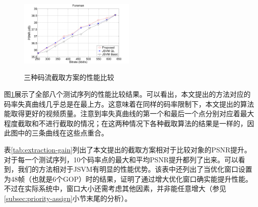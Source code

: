 \begin{figure}[!ht]
{		\includegraphics[width=0.5\textwidth]{figures/Foreman.jpg}
		\label{fig:Foreman}}
	\qquad
	\caption{三种码流截取方案的性能比较}
	\label{fig:extraction-performance}
\end{figure}

图\ref{fig:extraction-performance}展示了全部八个测试序列的性能比较结果。可以看出，本文提出的方法对应的码率失真曲线几乎总是在最上方。这意味着在同样的码率限制下，本文提出的算法能取得更好的视频质量。注意到率失真曲线的第一个和最后一个点分别对应着最大程度截取和不进行截取的情况；在这两种情况下各种截取算法的结果是一样的，因此图中的三条曲线在这些点重合。

表\ref{tab:extraction-gain}列出了本文提出的截取方案相对于比较对象的PSNR提升。对于每一个测试序列，10个码率点的最大和平均PSNR提升都列了出来。可以看到，我们的方法相对于JSVM有明显的性能优势。该表中还列出了当优化窗口设置为48帧（也就是6个GOP）时的结果，证明了通过增大优化窗口确实能提升性能。不过在实际系统中，窗口大小还需考虑其他因素，并非能任意增大（参见\ref{subsec:priority-assign}小节末尾的分析）。

